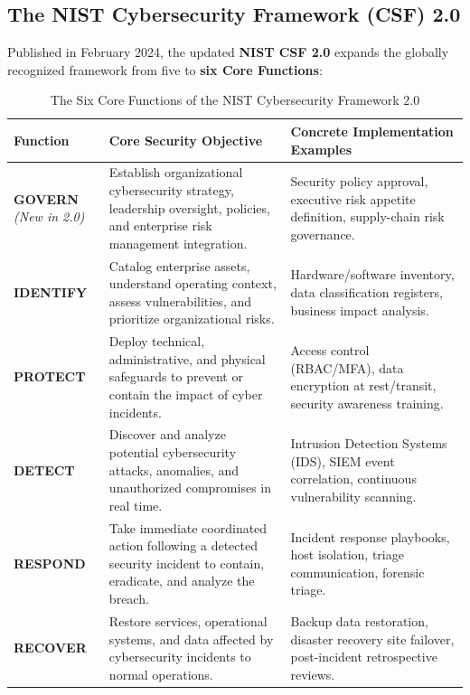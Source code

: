 \subsection{The NIST Cybersecurity Framework (CSF) 2.0}

Published in February 2024, the updated \textbf{NIST CSF 2.0} expands the globally recognized framework from five to \textbf{six Core Functions}:

\begin{table}[htbp]
\centering
\caption{The Six Core Functions of the NIST Cybersecurity Framework 2.0}
\label{tab:nist_csf_2}
\begin{tabularx}{\textwidth}{p{2.2cm} X X}
\toprule
\textbf{Function} & \textbf{Core Security Objective} & \textbf{Concrete Implementation Examples} \\
\midrule
\textbf{GOVERN} \newline \textit{(New in 2.0)} & Establish organizational cybersecurity strategy, leadership oversight, policies, and enterprise risk management integration. & Security policy approval, executive risk appetite definition, supply-chain risk governance. \\
\textbf{IDENTIFY} & Catalog enterprise assets, understand operating context, assess vulnerabilities, and prioritize organizational risks. & Hardware/software inventory, data classification registers, business impact analysis. \\
\textbf{PROTECT} & Deploy technical, administrative, and physical safeguards to prevent or contain the impact of cyber incidents. & Access control (RBAC/MFA), data encryption at rest/transit, security awareness training. \\
\textbf{DETECT} & Discover and analyze potential cybersecurity attacks, anomalies, and unauthorized compromises in real time. & Intrusion Detection Systems (IDS), SIEM event correlation, continuous vulnerability scanning. \\
\textbf{RESPOND} & Take immediate coordinated action following a detected security incident to contain, eradicate, and analyze the breach. & Incident response playbooks, host isolation, triage communication, forensic triage. \\
\textbf{RECOVER} & Restore services, operational systems, and data affected by cybersecurity incidents to normal operations. & Backup data restoration, disaster recovery site failover, post-incident retrospective reviews. \\
\bottomrule
\end{tabularx}
\end{table}

